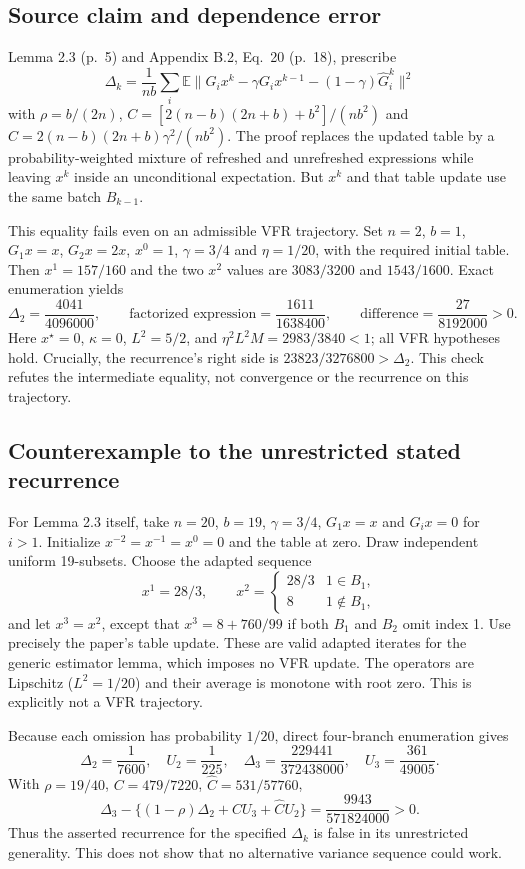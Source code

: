 \documentclass[10pt]{article}
\begin{document}
\subsection*{Source claim and dependence error}
Lemma 2.3 (p. 5) and Appendix B.2, Eq. 20 (p. 18), prescribe \[\Delta_k=\frac1{nb}\sum_i\mathbb E\|G_ix^k-\gamma G_ix^{k-1}
 -(1-\gamma)\widehat G_i^k\|^2\] with \(\rho=b/(2n)\), \(C=[2(n-b)(2n+b)+b^2]/(nb^2)\) and \(\widehat C=2(n-b)(2n+b)\gamma^2/(nb^2)\). The proof replaces the updated table by a probability-weighted mixture of refreshed and unrefreshed expressions while leaving \(x^k\) inside an unconditional expectation. But \(x^k\) and that table update use the same batch \(B_{k-1}\).\par
This equality fails even on an admissible VFR trajectory. Set \(n=2\), \(b=1\), \(G_1x=x\), \(G_2x=2x\), \(x^0=1\), \(\gamma=3/4\) and \(\eta=1/20\), with the required initial table. Then \(x^1=157/160\) and the two \(x^2\) values are \(3083/3200\) and \(1543/1600\). Exact enumeration yields \[\Delta_2=\frac{4041}{4096000},\qquad
 \text{factorized expression}=\frac{1611}{1638400},
 \qquad \text{difference}=\frac{27}{8192000}>0.\] Here \(x^\star=0\), \(\kappa=0\), \(L^2=5/2\), and \(\eta^2L^2M=2983/3840<1\); all VFR hypotheses hold. Crucially, the recurrence’s right side is \(23823/3276800>\Delta_2\). This check refutes the intermediate equality, not convergence or the recurrence on this trajectory.\par
\subsection*{Counterexample to the unrestricted stated recurrence}
For Lemma 2.3 itself, take \(n=20\), \(b=19\), \(\gamma=3/4\), \(G_1x=x\) and \(G_ix=0\) for \(i>1\). Initialize \(x^{-2}=x^{-1}=x^0=0\) and the table at zero. Draw independent uniform 19-subsets. Choose the adapted sequence \[x^1=28/3,\qquad
 x^2=\begin{cases}28/3&1\in B_1,\\8&1\notin B_1,\end{cases}\] and let \(x^3=x^2\), except that \(x^3=8+760/99\) if both \(B_1\) and \(B_2\) omit index 1. Use precisely the paper’s table update. These are valid adapted iterates for the generic estimator lemma, which imposes no VFR update. The operators are Lipschitz (\(L^2=1/20\)) and their average is monotone with root zero. This is explicitly not a VFR trajectory.\par
Because each omission has probability \(1/20\), direct four-branch enumeration gives \[\Delta_2=\frac1{7600},\quad U_2=\frac1{225},\quad
 \Delta_3=\frac{229441}{372438000},\quad U_3=\frac{361}{49005}.\] With \(\rho=19/40\), \(C=479/7220\), \(\widehat C=531/57760\), \[\Delta_3-\{(1-\rho)\Delta_2+CU_3+\widehat C U_2\}
 =\frac{9943}{571824000}>0.\] Thus the asserted recurrence for the specified \(\Delta_k\) is false in its unrestricted generality. This does not show that no alternative variance sequence could work.\par
\end{document}
